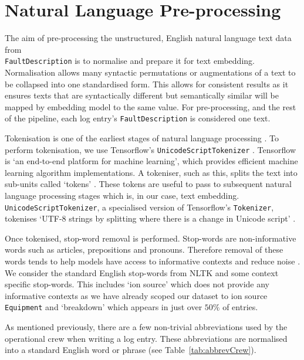 \documentclass[10pt,oneside]{report}
\begin{document}
\section{Natural Language Pre-processing}\label{sec:preproc}

The aim of pre-processing the unstructured, English natural language text data from \\ \texttt{FaultDescription} is to normalise and prepare it for text embedding. Normalisation allows many syntactic permutations or augmentations of a text to be collapsed into one standardised form. This allows for consistent results as it ensures texts that are syntactically different but semantically similar will be mapped by embedding model to the same value. For pre-processing, and the rest of the pipeline, each log entry's \texttt{FaultDescription} is considered one text.

Tokenisation is one of the earliest stages of natural language processing \cite{tabassum2020survey, sammons2016edison}. To perform tokenisation, we use Tensorflow's \texttt{UnicodeScriptTokenizer} \cite{tensorflow2015whitepaper}. Tensorflow is `an end-to-end platform for machine learning', which provides efficient machine learning algorithm implementations. A tokeniser, such as this, splits the text into sub-units called `tokens' \cite{gefenstette1999tokenization}. These tokens are useful to pass to subsequent natural language processing stages which is, in our case, text embedding. \texttt{UnicodeScriptTokenizer}, a specialised version of Tensorflow's \texttt{Tokenizer}, tokenises `UTF-8 strings by splitting where there is a change in Unicode script' \cite{tensorflow2015whitepaper}.

Once tokenised, stop-word removal is performed. Stop-words are non-informative words such as articles, prepositions and pronouns. Therefore removal of these words tends to help models have access to informative contexts and reduce noise \cite{silva2003importance}. We consider the standard English stop-words from NLTK \cite{bird2009natural} and some context specific stop-words. This includes `ion source' which does not provide any informative contexts as we have already scoped our dataset to ion source \texttt{Equipment} and `breakdown' which appears in just over $50\%$ of entries. 

As mentioned previously, there are a few non-trivial abbreviations used by the operational crew when writing a log entry. These abbreviations are normalised into a standard English word or phrase (see Table~\ref{tab:abbrevCrew}).
\end{document}
